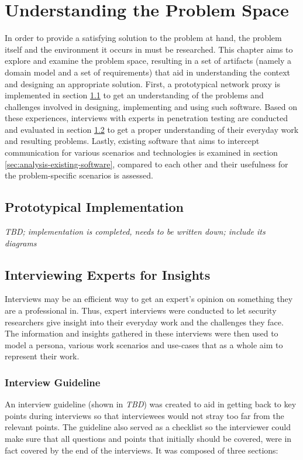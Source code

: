 \chapter{Understanding the Problem Space}
\label{chap:understanding-the-problem-space}
In order to provide a satisfying solution to the problem at hand, the problem itself and the environment it occurs in must be researched. This chapter aims to explore and examine the problem space, resulting in a set of artifacts (namely a domain model and a set of requirements) that aid in understanding the context and designing an appropriate solution. First, a prototypical network proxy is implemented in section \ref{sec:prototypical-implementation} to get an understanding of the problems and challenges involved in designing, implementing and using such software. Based on these experiences, interviews with experts in penetration testing are conducted and evaluated in section \ref{sec:interviews} to get a proper understanding of their everyday work and resulting problems. Lastly, existing software that aims to intercept communication for various scenarios and technologies is examined in section \ref{sec:analysis-existing-software}, compared to each other and their usefulness for the problem-specific scenarios is assessed.

\section{Prototypical Implementation}
\label{sec:prototypical-implementation}
\emph{TBD; implementation is completed, needs to be written down; include its diagrams} %

\section{Interviewing Experts for Insights}
\label{sec:interviews}
Interviews may be an efficient way to get an expert’s opinion on something they are a professional in. Thus, expert interviews were conducted to let security researchers give insight into their everyday work and the challenges they face. The information and insights gathered in these interviews were then used to model a persona, various work scenarios and use-cases that as a whole aim to represent their work.

\subsection{Interview Guideline}
An interview guideline (shown in \emph{TBD}) %
was created to aid in getting back to key points during interviews so that interviewees would not stray too far from the relevant points. The guideline also served as a checklist so the interviewer could make sure that all questions and points that initially should be covered, were in fact covered by the end of the interviews. It was composed of three sections:

